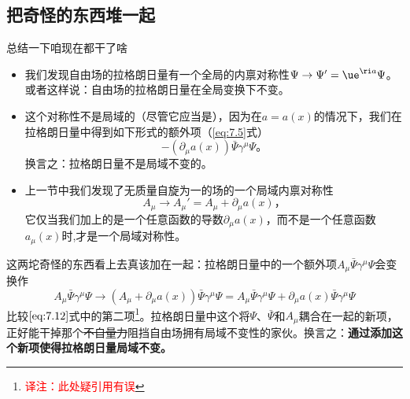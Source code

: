 \subsection{把奇怪的东西堆一起}\label{sec7.1.3}
总结一下咱现在都干了啥
\begin{itemize}
\item 我们发现\spint 自由场的拉格朗日量有一个全局的内禀对称性$\Psi\rightarrow\Psi' = \ue^{\ri a}\Psi$。或者这样说：\spint 自由场的拉格朗日量在全局\uo 变换下不变。
\item 这个对称性不是局域的（尽管它应当是），因为在$a=a(x)$的情况下，我们在拉格朗日量中得到如下形式的额外项（\ref{eq:7.5}式）
\begin{equation}
-(\partial_\mu a(x))\bar\Psi\gamma^\mu\Psi \text{。}
\label{eq:7.12}
\end{equation}
换言之：拉格朗日量不是局域\uo 不变的。
\item 上一节中我们发现了无质量自旋为一的场的一个局域内禀对称性
\begin{equation}
A_\mu \rightarrow A_\mu' = A_\mu +\partial_\mu a(x) \text{，}
\label{eq:7.13}
\end{equation}
它仅当我们加上的是一个任意函数的导数$\partial_\mu a(x)$，而不是一个任意函数$a_\mu(x)$时,才是一个局域对称性。
\end{itemize}
这两坨奇怪的东西看上去真该加在一起：拉格朗日量中的一个额外项$A_\mu\bar\Psi\gamma^\mu\Psi$会变换作
\begin{equation}
A_\mu\bar\Psi\gamma^\mu\Psi \rightarrow (A_\mu+\partial_\mu a(x))\bar\Psi\gamma^\mu\Psi = A_\mu\bar\Psi\gamma^\mu\Psi + \partial_\mu a(x)\bar\Psi\gamma^\mu\Psi
\end{equation}
比较$\ref{eq:7.12}$式中的第二项\footnote{\textcolor{red}{译注：此处疑引用有误}}。拉格朗日量中这个将$\Psi$、$\bar\Psi$和$A_\mu$耦合在一起的新项，正好能干掉那个\sout{不自量力}阻挡\spint 自由场拥有局域\uo 不变性的家伙。换言之：{\bf 通过添加这个新项使得拉格朗日量局域\uo 不变。}

